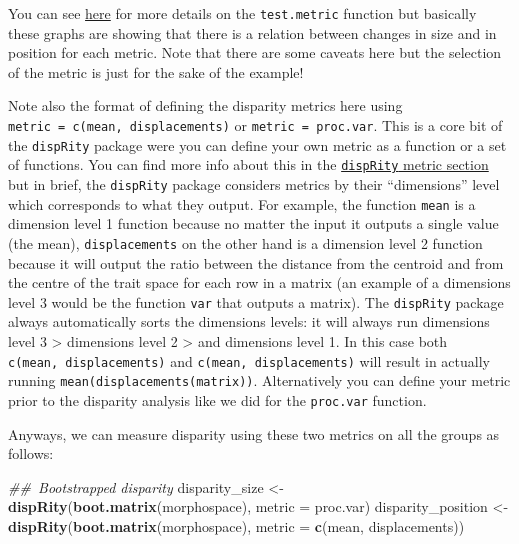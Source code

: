 \documentclass[]{book}
\newenvironment{Shaded}{\begin{snugshade}}{\end{snugshade}}
\newcommand{\CommentTok}[1]{\textcolor[rgb]{0.56,0.35,0.01}{\textit{#1}}}
\newcommand{\DataTypeTok}[1]{\textcolor[rgb]{0.13,0.29,0.53}{#1}}
\newcommand{\KeywordTok}[1]{\textcolor[rgb]{0.13,0.29,0.53}{\textbf{#1}}}
\newcommand{\NormalTok}[1]{#1}
\newcommand{\StringTok}[1]{\textcolor[rgb]{0.31,0.60,0.02}{#1}}
\begin{document}
You can see \protect\hyperlink{test-metric}{here} for more details on the \texttt{test.metric} function but basically these graphs are showing that there is a relation between changes in size and in position for each metric.
Note that there are some caveats here but the selection of the metric is just for the sake of the example!

Note also the format of defining the disparity metrics here using \texttt{metric\ =\ c(mean,\ displacements)} or \texttt{metric\ =\ proc.var}. This is a core bit of the \texttt{dispRity} package were you can define your own metric as a function or a set of functions. You can find more info about this in the \protect\hyperlink{disparity-metrics}{\texttt{dispRity} metric section} but in brief, the \texttt{dispRity} package considers metrics by their ``dimensions'' level which corresponds to what they output. For example, the function \texttt{mean} is a dimension level 1 function because no matter the input it outputs a single value (the mean), \texttt{displacements} on the other hand is a dimension level 2 function because it will output the ratio between the distance from the centroid and from the centre of the trait space for each row in a matrix (an example of a dimensions level 3 would be the function \texttt{var} that outputs a matrix).
The \texttt{dispRity} package always automatically sorts the dimensions levels: it will always run dimensions level 3 \textgreater{} dimensions level 2 \textgreater{} and dimensions level 1. In this case both \texttt{c(mean,\ displacements)} and \texttt{c(mean,\ displacements)} will result in actually running \texttt{mean(displacements(matrix))}.
Alternatively you can define your metric prior to the disparity analysis like we did for the \texttt{proc.var} function.

Anyways, we can measure disparity using these two metrics on all the groups as follows:

\begin{Shaded}
\begin{Highlighting}[]
\CommentTok{## Bootstrapped disparity}
\NormalTok{disparity_size <-}\StringTok{  }\KeywordTok{dispRity}\NormalTok{(}\KeywordTok{boot.matrix}\NormalTok{(morphospace), }\DataTypeTok{metric =}\NormalTok{ proc.var)}
\NormalTok{disparity_position <-}\StringTok{ }\KeywordTok{dispRity}\NormalTok{(}\KeywordTok{boot.matrix}\NormalTok{(morphospace), }\DataTypeTok{metric =} \KeywordTok{c}\NormalTok{(mean, displacements))}
\end{Highlighting}
\end{Shaded}
\end{document}
